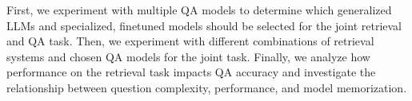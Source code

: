         

        
        





First, we experiment with multiple QA models to determine which generalized LLMs and specialized, finetuned models should be selected for the joint retrieval and QA task. Then, we experiment with different combinations of retrieval systems and chosen QA models for the joint task. Finally, we analyze how performance on the retrieval task impacts QA accuracy and investigate the relationship between question complexity, performance, and model memorization.

